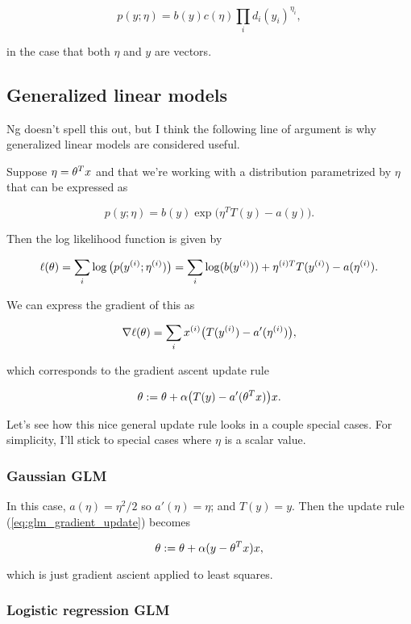 \documentclass[]{article}
\begin{document}
\[p(y;\eta) = b(y)c(\eta)\prod_i d_i(y_i)^{\eta_i},\]

in the case that both \(\eta\) and \(y\) are vectors.

\subsection{Generalized linear models}\label{generalized-linear-models}

Ng doesn't spell this out, but I think the following line of argument is
why generalized linear models are considered useful.

Suppose \(\eta = \theta^Tx\) and that we're working with a distribution
parametrized by \(\eta\) that can be expressed as

\[p(y;\eta) = b(y)\exp\big(\eta^TT(y)-a(y)\big).\]

Then the log likelihood function is given by

\[\ell(\theta) = \sum_i\log\big(p(y^{(i)};\eta^{(i)})\big)
= \sum_i\log(b(y^{(i)})) + \eta^{(i)T}T(y^{(i)})-a(\eta^{(i)}).\]

We can express the gradient of this as

\[\nabla\ell(\theta) = \sum_i x^{(i)}\big(T(y^{(i)})-a'(\eta^{(i)})\big),\]

which corresponds to the gradient ascent update rule

\begin{equation}\theta := \theta + \alpha\big(T(y)-a'(\theta^Tx)\big)x.\label{eq:glm_gradient_update}\end{equation}

Let's see how this nice general update rule looks in a couple special
cases. For simplicity, I'll stick to special cases where \(\eta\) is a
scalar value.

\subsubsection{Gaussian GLM}\label{gaussian-glm}

In this case, \(a(\eta) = \eta^2/2\) so \(a'(\eta) = \eta\); and
\(T(y)=y\). Then the update rule (\ref{eq:glm_gradient_update}) becomes

\[\theta := \theta + \alpha(y-\theta^Tx)x,\]

which is just gradient ascient applied to least squares.

\subsubsection{Logistic regression GLM}\label{logistic-regression-glm}
\end{document}
